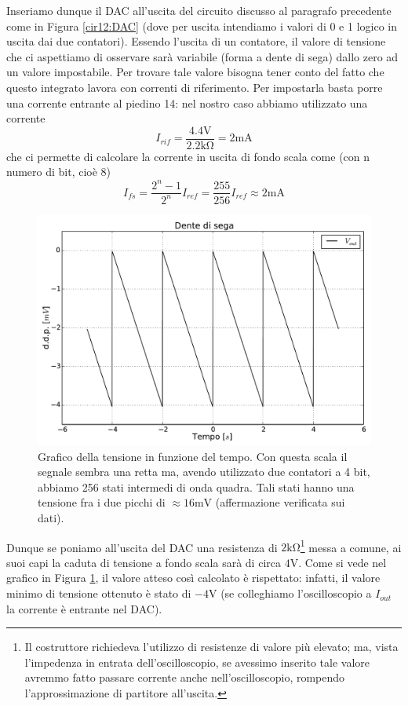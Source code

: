 Inseriamo dunque il DAC all'uscita del circuito discusso al paragrafo precedente come in Figura \ref{cir12:DAC} (dove per uscita intendiamo i valori di 0 e 1 logico in uscita dai due contatori). Essendo l'uscita di un contatore, il valore di tensione che ci aspettiamo di osservare sarà variabile (forma a dente di sega) dallo zero ad un valore impostabile. Per trovare tale valore bisogna tener conto del fatto che questo integrato lavora con correnti di riferimento. Per impostarla basta porre una corrente entrante al piedino 14: nel nostro caso abbiamo utilizzato una corrente
$$I_{rif}=\frac{4.4 \si{\volt}}{2.2\si{\kilo\ohm}} = 2 \si{\milli\ampere}$$
che ci permette di calcolare la corrente in uscita di fondo scala come (con n numero di bit, cioè 8)
$$I_{fs}=\frac{2^n-1}{2^n} I_{ref} = \frac{255}{256} I_{ref} \approx 2 \si{\milli\ampere}$$

\begin{figure}[htpc]
\centering
	\includegraphics[width=.65\textwidth]{../E12/latex/sega.pdf}
	\caption{Grafico della tensione in funzione del tempo. Con questa scala il segnale sembra una retta ma, avendo utilizzato due contatori a 4 bit, abbiamo 256 stati intermedi di onda quadra. Tali stati hanno una tensione fra i due picchi di $\approx 16 \si{\milli \volt}$ (affermazione verificata sui dati).}
	\label{fig12:sega}
\end{figure}

Dunque se poniamo all'uscita del DAC una resistenza di $2 \si{\kilo\ohm}$\footnote{Il costruttore richiedeva l'utilizzo di resistenze di valore più elevato; ma, vista l'impedenza in entrata dell'oscilloscopio, se avessimo inserito tale valore avremmo fatto passare corrente anche nell'oscilloscopio, rompendo l'approssimazione di partitore all'uscita.} messa a comune, ai suoi capi la caduta di tensione a fondo scala sarà di circa $4 \si{\volt}$. Come si vede nel grafico in Figura \ref{fig12:sega}, il valore atteso così calcolato è rispettato: infatti, il valore minimo di tensione ottenuto è stato di $-4 \si{\volt}$ (se colleghiamo l'oscilloscopio a $I_{out}$ la corrente è entrante nel DAC).

